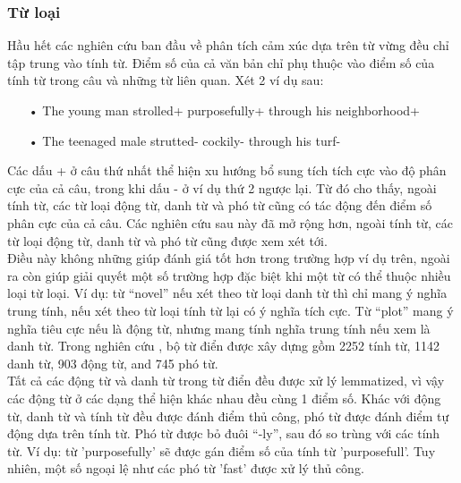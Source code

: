\subsubsection*{Từ loại}
Hầu hết các nghiên cứu ban đầu về phân tích cảm xúc dựa trên từ vừng đều chỉ tập trung vào tính từ. Điểm số của cả văn bản chỉ phụ thuộc vào điểm số của tính từ trong câu và những từ liên quan. 
Xét 2 ví dụ sau: 
\begin{itemize}
\item[•] The young man strolled+ purposefully+ through his neighborhood+
\item[•] The teenaged male strutted- cockily- through his turf-
\end{itemize}
Các dấu + ở câu thứ nhất thể hiện xu hướng bổ sung tích tích cực vào độ phân cực của cả câu, trong khi dấu - ở ví dụ thứ 2 ngược lại. Từ đó cho thấy, ngoài tính từ, các từ loại động từ, danh từ và phó từ cũng có tác động đến điểm số phân cực của cả câu. Các nghiên cứu sau này đã mở rộng hơn, ngoài tính từ, các từ loại động từ, danh từ và phó từ cũng được xem xét tới. \\

Điều này không những giúp đánh giá tốt hơn trong trường hợp ví dụ trên, ngoài ra còn giúp giải quyết một số trường hợp đặc biệt khi một từ có thể thuộc nhiều loại từ loại. Ví dụ: từ ``novel'' nếu xét theo từ loại danh từ thì chỉ mang ý nghĩa trung tính, nếu xét theo từ loại tính từ lại có ý nghĩa tích cực. Từ ``plot'' mang ý nghĩa tiêu cực nếu là động từ, nhưng mang tính nghĩa trung tính nếu xem là danh từ. Trong nghiên cứu \cite{taboada2011lexicon}, bộ từ điển được xây dựng gồm 2252 tính từ, 1142 danh từ, 903 động từ, and 745 phó từ. \\

Tất cả các động từ và danh từ trong từ điển đều được xử lý lemmatized, vì vậy các động từ ở các dạng thể hiện khác nhau đều cùng 1 điểm số. Khác với động từ, danh từ và tính từ đều được đánh điểm thủ công, phó từ được đánh điểm tự động dựa trên tính từ. Phó từ được bỏ đuôi ``-ly'', sau đó so trùng với các tính từ. Ví dụ: từ 'purposefully' sẽ được gán điểm số của tính từ 'purposefull'. Tuy nhiên, một số ngoại lệ như các phó từ 'fast' được xử lý thủ công. 

